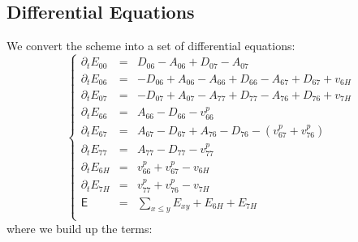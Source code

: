 \documentclass[aps,onecolumn,11pt]{revtex4}
\begin{document}
\subsection{Differential Equations}
We convert the scheme into a set of differential equations:
\begin{equation}
\left\lbrace
\begin{array}{rcl}
\partial_t E_{00} & = & D_{06}-A_{06} + D_{07}-A_{07}\\
\partial_t E_{06} & = & -D_{06}+A_{06} - A_{66} + D_{66} - A_{67} + D_{67} + v_{6H}\\
\partial_t E_{07} & = & -D_{07}+A_{07} - A_{77} + D_{77} - A_{76} + D_{76} + v_{7H}\\
\partial_t E_{66} & = & A_{66}-D_{66} -v^p_{66}\\
\partial_t E_{67} & = & A_{67}-D_{67} + A_{76}-D_{76} - (v^p_{67}+v^p_{76})\\
\partial_t E_{77} & = & A_{77}-D_{77} - v^p_{77}\\
\partial_t E_{6H} & = & v^p_{66}+v^p_{67} - v_{6H}\\
\partial_t E_{7H} & = & v^p_{77}+v^p_{76} - v_{7H}\\
\mathsf{E}      & = & {\displaystyle \sum_{x\leq y} E_{xy}}+E_{6H}+E_{7H}\\
\end{array}
\right.
\end{equation}
where we build up the terms:
\end{document}
